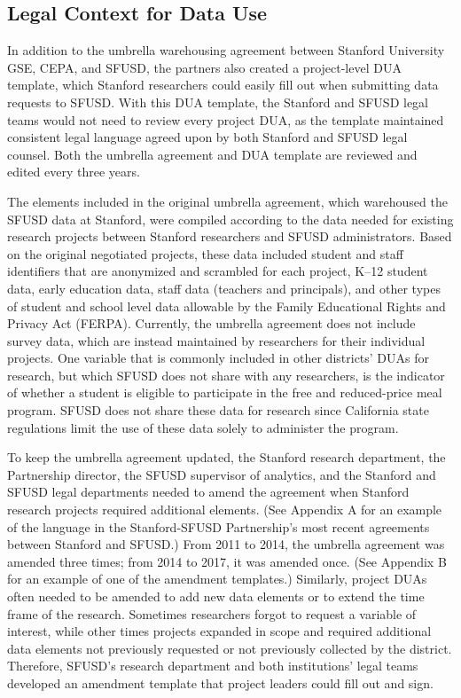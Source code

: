 \hypertarget{legal-context-for-data-use-4}{%
\subsection{Legal Context for Data Use}\label{legal-context-for-data-use-4}}

In addition to the umbrella warehousing agreement between Stanford University GSE, CEPA, and SFUSD, the partners also created a project-level DUA template, which Stanford researchers could easily fill out when submitting data requests to SFUSD. With this DUA template, the Stanford and SFUSD legal teams would not need to review every project DUA, as the template maintained consistent legal language agreed upon by both Stanford and SFUSD legal counsel. Both the umbrella agreement and DUA template are reviewed and edited every three years.

The elements included in the original umbrella agreement, which warehoused the SFUSD data at Stanford, were compiled according to the data needed for existing research projects between Stanford researchers and SFUSD administrators. Based on the original negotiated projects, these data included student and staff identifiers that are anonymized and scrambled for each project, K--12 student data, early education data, staff data (teachers and principals), and other types of student and school level data allowable by the Family Educational Rights and Privacy Act (FERPA). Currently, the umbrella agreement does not include survey data, which are instead maintained by researchers for their individual projects. One variable that is commonly included in other districts' DUAs for research, but which SFUSD does not share with any researchers, is the indicator of whether a student is eligible to participate in the free and reduced-price meal program. SFUSD does not share these data for research since California state regulations limit the use of these data solely to administer the program.

To keep the umbrella agreement updated, the Stanford research department, the Partnership director, the SFUSD supervisor of analytics, and the Stanford and SFUSD legal departments needed to amend the agreement when Stanford research projects required additional elements. (See Appendix A for an example of the language in the Stanford-SFUSD Partnership's most recent agreements between Stanford and SFUSD.) From 2011 to 2014, the umbrella agreement was amended three times; from 2014 to 2017, it was amended once. (See Appendix B for an example of one of the amendment templates.) Similarly, project DUAs often needed to be amended to add new data elements or to extend the time frame of the research. Sometimes researchers forgot to request a variable of interest, while other times projects expanded in scope and required additional data elements not previously requested or not previously collected by the district. Therefore, SFUSD's research department and both institutions' legal teams developed an amendment template that project leaders could fill out and sign.

